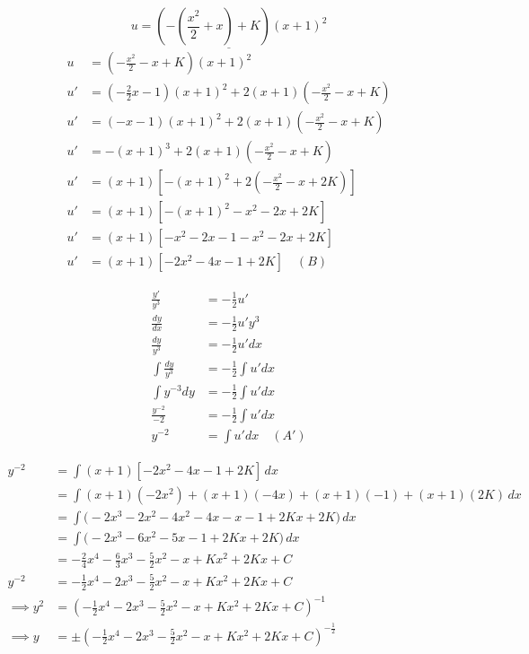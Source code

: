 \[
\underline{u = \left(- \left(\frac{x^2}{2} + x\right) + K\right) (x+1)^2}
\]
\begin{align*}
	u &= (-\frac{x^2}{2} - x + K) (x+1)^2 \\
	u' &= (-\frac{2}{2}x - 1) (x+1)^2 + 2 (x+1) (-\frac{x^2}{2} - x + K) \\
	u' &= (-x - 1) (x+1)^2 + 2 (x+1) (-\frac{x^2}{2} - x + K) \\
	u' &= -(x+1)^3 + 2 (x+1) (-\frac{x^2}{2} - x + K) \\
	u' &= (x+1) [-(x+1)^2 + 2(-\frac{x^2}{2} - x + 2K)] \\
	u' &= (x+1) [-(x+1)^2 -x^2 -2x + 2K] \\
	u' &= (x+1) [-x^2 - 2x -1 -x^2 -2x + 2K] \\
	u' &= (x+1) [-2x^2 - 4x -1 + 2K] \quad (B)
\end{align*}

\begin{align*}
	\frac{y'}{y^3} &= -\frac{1}{2}u'\\
	\frac{dy}{dx} &= -\frac{1}{2}u' y^3 \\
	\frac{dy}{y^3} &= - \frac{1}{2} u' dx \\
	\int \frac{dy}{y^3} &= - \frac{1}{2} \int u' dx \\
	\int y^{-3}{dy} &= - \frac{1}{2} \int u' dx \\
	\frac{y^{-2}}{-2} &= - \frac{1}{2} \int u' dx \\
	{y^{-2}} &=\int u' dx \quad (A')
\end{align*}

\begin{align*}
	y^{-2} &= \int (x+1) [-2x^2 - 4x -1 + 2K] \, dx \\
	&= \int (x+1)(-2x^2) + (x+1)(-4x) + (x+1)(-1) + (x+1)(2K) \, dx \\
	&= \int \big( -2x^3 - 2x^2 - 4x^2 - 4x - x - 1 + 2Kx + 2K \big) \, dx \\
	&= \int \big( -2x^3 - 6x^2 - 5x - 1 + 2Kx + 2K \big) \, dx \\
	&= -\frac{2}{4}x^4 - \frac{6}{3}x^3 - \frac{5}{2}x^2 - x + Kx^2 + 2Kx + C \\
	y^{-2} &= -\frac{1}{2}x^4 - 2x^3 - \frac{5}{2}x^2 - x + Kx^2 + 2Kx + C \\ 
	\implies
	y^2 &= (-\frac{1}{2}x^4 - 2x^3 - \frac{5}{2}x^2 - x + Kx^2 + 2Kx + C) ^{-1} \\
	\implies
	y &= \pm (-\frac{1}{2}x^4 - 2x^3 - \frac{5}{2}x^2 - x + Kx^2 + 2Kx + C) ^{-\frac{1}{2}}
\end{align*}

